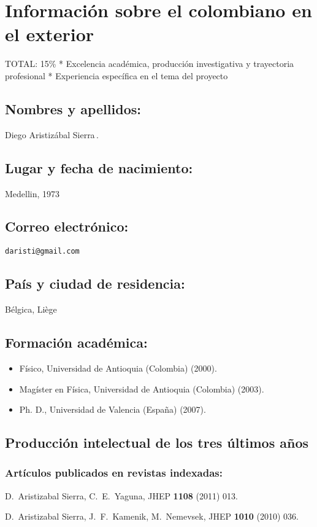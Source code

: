 \section{Información sobre el colombiano en el exterior}
\begin{evaluacion}
  TOTAL: 15\%
  * Excelencia académica, producción investigativa y trayectoria profesional
  * Experiencia específica en el tema del proyecto
\end{evaluacion}
\subsection{Nombres y apellidos:}
Diego Aristizábal Sierra\,.
\subsection{Lugar y fecha de nacimiento:}
Medellin, 1973
\subsection{Correo electrónico:}
\texttt{daristi@gmail.com}
\subsection{País y ciudad de residencia:}
Bélgica, Liège
\subsection{Formación académica:}
\begin{itemize}
\item Físico, Universidad de Antioquia (Colombia) (2000).
\item Magíster en Física, Universidad de Antioquia (Colombia) (2003).
\item Ph. D., Universidad de Valencia (España) (2007).
\end{itemize}
\subsection{Producción intelectual de los tres últimos años}
\subsubsection{Artículos publicados en revistas indexadas:}
  D.~Aristizabal Sierra, C.~E.~Yaguna,
  JHEP {\bf 1108 } (2011)  013.

  D.~Aristizabal Sierra, J.~F.~Kamenik, M.~Nemevsek,
  JHEP {\bf 1010 } (2010)  036.

